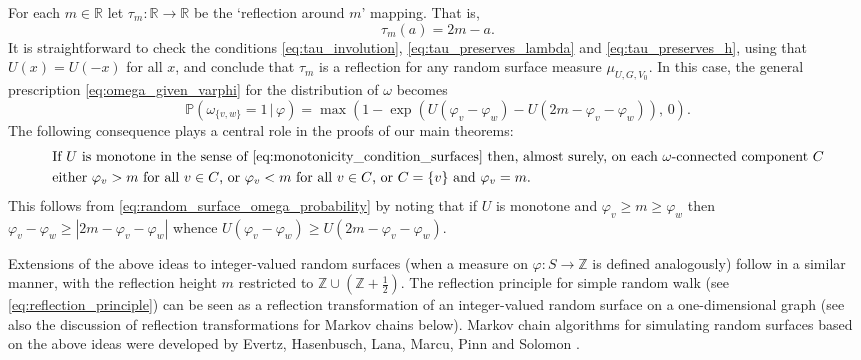 \documentclass[english]{article}
\renewcommand{\P}{\mathbb{P}}
\theoremstyle{plain}
\theoremstyle{plain}
\begin{document}
For each $m\in\mathbb{R}$ let $\tau_m:\mathbb{R}\to\mathbb{R}$ be
the `reflection around $m$' mapping. That is,
\begin{equation}\label{eq:random_surfaces_reflection}
\tau_m(a) = 2m - a.
\end{equation}
It is straightforward to check the conditions
\eqref{eq:tau_involution}, \eqref{eq:tau_preserves_lambda} and
\eqref{eq:tau_preserves_h}, using that $U(x) = U(-x)$ for all $x$, and conclude that $\tau_m$ is a
reflection for any random surface measure $\mu_{U,G,V_0}$. In this
case, the general prescription \eqref{eq:omega_given_varphi} for the
distribution of $\omega$ becomes
\begin{equation}\label{eq:random_surface_omega_probability}
  \P(\omega_{\{v,w\}} = 1\, |\, \varphi) = \max\left(1 -
  \exp(U(\varphi_v - \varphi_w) - U(2m - \varphi_v - \varphi_w)),\, 0\right).
\end{equation}
The following consequence plays a central role in the proofs of our
main theorems:
\begin{equation}\label{eq:random_surface_omega_connection_restriction}
\begin{split}
  &\text{If $U$ is monotone in the sense of
\eqref{eq:monotonicity_condition_surfaces} then, almost surely, on each $\omega$-connected component $C$}\\
  &\text{either
$\varphi_v>m$ for all $v\in C$, or $\varphi_v<m$ for all $v\in
C$, or $C = \{v\}$ and $\varphi_v = m$.}
\end{split}
\end{equation}
This follows from \eqref{eq:random_surface_omega_probability} by
noting that if $U$ is monotone and $\varphi_v\ge m\ge \varphi_w$
then $\varphi_v - \varphi_w \ge |2m-\varphi_v-\varphi_w|$ whence
$U(\varphi_v - \varphi_w) \ge U(2m - \varphi_v - \varphi_w)$.

Extensions of the above ideas to integer-valued random surfaces
(when a measure on $\varphi:S\to\mathbb{Z}$ is defined analogously)
follow in a similar manner, with the reflection height $m$
restricted to $\mathbb{Z}\cup(\mathbb{Z}+\frac{1}{2})$. The reflection principle for simple random walk (see \eqref{eq:reflection_principle}) can be seen as a reflection transformation of an integer-valued random surface on a one-dimensional graph (see also the discussion of reflection transformations for Markov chains below). Markov chain
algorithms for simulating random surfaces based on the above ideas
were developed by Evertz, Hasenbusch, Lana, Marcu, Pinn and Solomon
\cite{evertz1991stochastic, hasenbusch1992cluster}.
\end{document}
